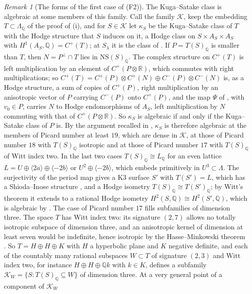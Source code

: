 \documentclass[11pt,reqno]{amsart}
\theoremstyle{plain}
\theoremstyle{definition}
\theoremstyle{remark}
\newtheorem{remark}[theorem]{Remark}
\newcommand{\QQ}{\mathbb{Q}}
\newcommand{\RR}{\mathbb{R}}
\newcommand{\cK}{\mathcal{K}}
\newcommand{\NS}{\mathrm{NS}}
\begin{document}
\begin{remark}[The forms of the first case of (F2)]
The Kuga--Satake class is algebraic at some members of this family. Call the
family $\cK$, keep the embedding $T\subset\Lambda_{\QQ}$ of the proof of
(i), and
for $S\in\cK$ let $\kappa_{S}$ be the Kuga--Satake class of $T$ with the Hodge
structure that $S$ induces on it, a Hodge class on $S\times A_{S}\times A_{S}$
with $H^{1}(A_{S},\QQ)=C^{+}(T)$; at $S_{\lambda}$ it is the class of
. If $P=T(S)_{\QQ}$ is smaller than $T$, then
$N=P^{\perp}\cap T$ lies in $\NS(S)_{\QQ}$. The complex structure on
$C^{+}(T)$ is left multiplication by an element of $C^{+}(P\otimes\RR)$, which
commutes with right multiplications; so
$C^{+}(T)=C^{+}(P)\otimes C^{+}(N)\oplus C^{-}(P)\otimes C^{-}(N)$ is, as a
Hodge structure, a sum of copies of $C^{+}(P)$, right multiplication by an
anisotropic vector of $P$ carrying $C^{-}(P)$ onto $C^{+}(P)$, and the map
$\Psi$ of \cite[Proposition~11.7]{paperI}, with $v_{0}\in P$, carries $N$ to Hodge
endomorphisms of $A_{S}$, left multiplication by $N$ commuting with that of
$C^{+}(P\otimes\RR)$. So $\kappa_{S}$ is algebraic if and only if the
Kuga--Satake class of $P$ is. By the argument recalled in
, $\kappa_{S}$ is therefore algebraic at the members of
Picard number at least $19$, which are dense in $\cK$, at those of Picard
number $18$ with $T(S)_{\QQ}$ isotropic and at those of Picard number $17$
with $T(S)_{\QQ}$ of Witt index two. In the last two cases
$T(S)_{\QQ}\cong L_{\QQ}$ for an even lattice
$L=U\oplus\langle2a\rangle\oplus\langle-2b\rangle$ or
$U^{2}\oplus\langle-2b\rangle$, which embeds primitively in
$U^{3}\subset\Lambda$. The surjectivity of the period map gives a K3 surface
$S'$ with $T(S')=L$, which has a Shioda--Inose structure
\cite[Corollary~6.4]{Mor84}, and a Hodge isometry
$T(S)_{\QQ}\cong T(S')_{\QQ}$; by Witt's theorem it extends to a rational
Hodge isometry $H^{2}(S,\QQ)\cong H^{2}(S',\QQ)$, which is algebraic by
\cite{Bus19}. The case of Picard number $17$
fills subfamilies of dimension three. The space $T$ has Witt index two: its
signature $(2,7)$ allows no totally isotropic subspace of dimension three, and
an anisotropic kernel of dimension at least seven would be indefinite, hence
isotropic by the Hasse--Minkowski theorem \cite{OMe00}. So $T=H\oplus H\oplus
K$ with $H$ a hyperbolic plane and $K$ negative definite, and each of the
countably many rational subspaces $W\subset T$ of signature $(2,3)$ and Witt
index two, for instance $H\oplus H\oplus\QQ k$ with $k\in K$, defines a
subfamily $\cK_{W}=\{S:T(S)_{\QQ}\subseteq W\}$ of dimension three. At a very general point of a component of $\cK_{W}$

\end{remark}
\end{document}
